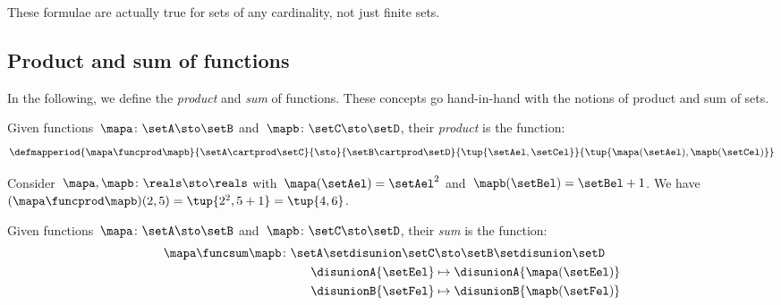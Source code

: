 These formulae are actually true for sets of any cardinality, not just finite sets.

\subsection{Product and sum of functions}
\label{sec:prod_dirsum_functions}

In the following, we define the \emph{product} and \emph{sum} of functions.
These concepts go hand-in-hand with the notions of product and sum of sets.

\begin{ctdefinition}
    \label{def:prod_functions}
    Given functions~$\mapa\colon \setA \sto \setB$ and~$\mapb\colon \setC \sto \setD$, their \emph{product} is the function:
    \begin{equation}
        \defmapperiod{
            \mapa \funcprod \mapb
        }{
            \setA \cartprod \setC
        }{
            \sto
        }{
            \setB\cartprod \setD
        }{
            \tup{\setAel, \setCel}
        }{
            \tup{\mapa(\setAel),\mapb(\setCel)}
        }
    \end{equation}
\end{ctdefinition}

\begin{example}
    Consider~$\mapa,\mapb \colon \reals \sto \reals$ with~$\mapa(\setAel)=\setAel^2$ and~$\mapb(\setBel)=\setBel+1$.
    We have~$(\mapa \funcprod \mapb)(2,5)=\tup{2^2,5+1}=\tup{4,6}$.
\end{example}

\begin{ctdefinition}
    \label{def:dirsum_functions}
    Given functions~$\mapa\colon \setA \sto \setB$ and~$\mapb\colon \setC \sto \setD$, their \emph{sum} is the function:
    \begin{equation}
        \begin{aligned}
            \mapa \funcsum \mapb \colon \setA \setdisunion \setC & \sto \setB\setdisunion \setD \\
            \disunionA{\setEel}                                  & \mapsto \disunionA{\mapa(\setEel)} \\
            \disunionB{\setFel}                                  & \mapsto \disunionB{\mapb(\setFel)} \\
        \end{aligned}
    \end{equation}
\end{ctdefinition}

